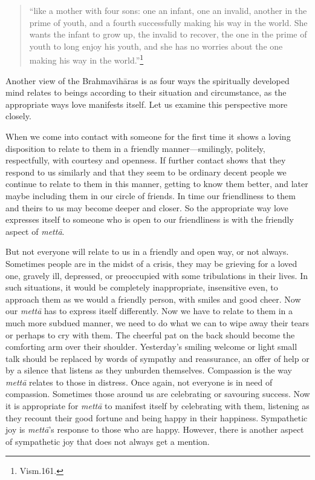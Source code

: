 \documentclass[10pt, openright]{book}
\begin{document}
\begin{quote}

\hspace{-0.4em}“like a mother with four sons: one an infant, one an invalid, another in the prime of youth, and a fourth successfully making his way in the world. She wants the infant to grow up, the invalid to recover, the one in the prime of youth to long enjoy his youth, and she has no worries about the one making his way in the world.”\footnote {Vism.161.}


\end{quote}
Another view of the Brahmavihāras is as four ways the spiritually developed mind relates to beings according to their situation and circumstance, as the appropriate ways love manifests itself. Let us examine this perspective more closely.


When we come into contact with someone for the first time it shows a loving disposition to relate to them in a friendly manner—smilingly, politely, respectfully, with courtesy and openness. If further contact shows that they respond to us similarly and that they seem to be ordinary decent people we continue to relate to them in this manner, getting to know them better, and later maybe including them in our circle of friends. In time our friendliness to them and theirs to us may become deeper and closer. So the appropriate way love expresses itself to someone who is open to our friendliness is with the friendly aspect of \textit{mettā}.


But not everyone will relate to us in a friendly and open way, or not always. Sometimes people are in the midst of a crisis, they may be grieving for a loved one, gravely ill, depressed, or preoccupied with some tribulations in their lives. In such situations, it would be completely inappropriate, insensitive even, to approach them as we would a friendly person, with smiles and good cheer. Now our \textit{mettā} has to express itself differently. Now we have to relate to them in a much more subdued manner, we need to do what we can to wipe away their tears or perhaps to cry with them. The cheerful pat on the back should become the comforting arm over their shoulder. Yesterday’s smiling welcome or light small talk should be replaced by words of sympathy and reassurance, an offer of help or by a silence that listens as they unburden themselves. Compassion is the way \textit{mettā} relates to those in distress. Once again, not everyone is in need of compassion. Sometimes those around us are celebrating or savouring success. Now it is appropriate for \textit{mettā} to manifest itself by celebrating with them, listening as they recount their good fortune and being happy in their happiness. Sympathetic joy is \textit{mettā}’s response to those who are happy. However, there is another aspect of sympathetic joy that does not always get a mention.
\end{document}
